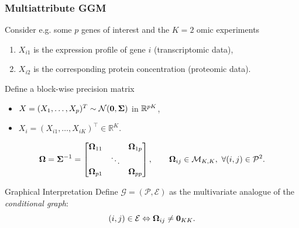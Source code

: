 \begin{frame}
  \frametitle{Multiattribute GGM}

    Consider e.g. some $p$ genes of interest and the $K=2$ omic experiments
    \begin{enumerate}
    \item $X_{i1}$ is the expression profile of gene $i$ (transcriptomic data),
    \item $X_{i2}$ is the corresponding protein concentration (proteomic data).
    \end{enumerate}

    \vfill

  \begin{block}{Define a block-wise precision matrix}
      \vspace{-.25cm}
      \begin{itemize}
      \item  $X =  (X_1,  \dots,  X_p)^T \sim  \mathcal{N}(\mathbf{0},
        \boldsymbol{\Sigma})$ in $\mathbb{R}^{pK}$,
      \item $X_i=(X_{i1},\dots,X_{iK})^\intercal \in \mathbb{R}^K$.
      \end{itemize}
      \[
      \boldsymbol{\Omega} = \boldsymbol{\Sigma}^{-1} = \begin{bmatrix}
        \boldsymbol{\Omega}_{11} & & \boldsymbol{\Omega}_{1p} \\
        & \ddots & \\
        \boldsymbol{\Omega}_{p1} & & \boldsymbol{\Omega}_{pp} \\
      \end{bmatrix}, \qquad  \boldsymbol{\Omega}_{ij} \in \mathcal{M}_{K,K},
      \ \forall (i,j)\in\mathcal{P}^2.
      \]
    \end{block}

    \vfill

    \begin{beamerboxesrounded}[upper=sur:head,lower=sur:bloc,shadow=true]{Graphical Interpretation}
      Define  $\mathcal{G}=(\mathcal{P},\mathcal{E})$   as  \alert{the
        multivariate analogue} of the {\it conditional graph}:
      \vspace{-.25cm}
      \begin{equation*}
        (i,j)\in    \mathcal{E}    \Leftrightarrow    \boldsymbol{\Omega}_{ij}    \ne
        \mathbf{0}_{KK}.
      \end{equation*}
    \end{beamerboxesrounded}

\end{frame}

